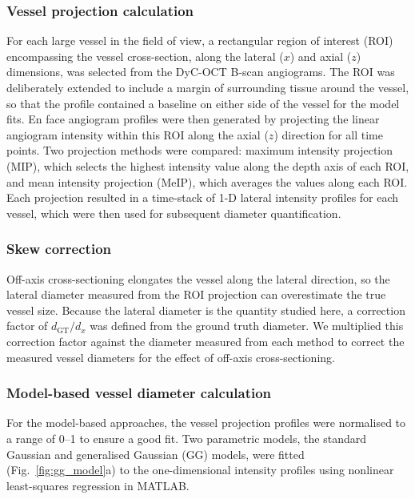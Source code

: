 \subsubsection{Vessel projection calculation}
\label{subsubsec:vessel_projection}
For each large vessel in the field of view, a rectangular region of interest (ROI) encompassing the vessel cross-section, along the lateral ($x$) and axial ($z$) dimensions, was selected from the DyC-OCT B-scan angiograms. The ROI was deliberately extended to include a margin of surrounding tissue around the vessel, so that the profile contained a baseline on either side of the vessel for the model fits. En face angiogram profiles were then generated by projecting the linear angiogram intensity within this ROI along the axial ($z$) direction for all time points. Two projection methods were compared: maximum intensity projection (MIP), which selects the highest intensity value along the depth axis of each ROI, and mean intensity projection (MeIP), which averages the values along each ROI. Each projection resulted in a time-stack of 1-D lateral intensity profiles for each vessel, which were then used for subsequent diameter quantification. 

\subsubsection{Skew correction}
\label{subsubsec:skew_correction}
Off-axis cross-sectioning elongates the vessel along the lateral direction, so the lateral diameter measured from the ROI projection can overestimate the true vessel size. Because the lateral diameter is the quantity studied here, a correction factor of $d_{\mathrm{GT}}/d_x$ was defined from the ground truth diameter. We multiplied this correction factor against the diameter measured from each method to correct the measured vessel diameters for the effect of off-axis cross-sectioning.

\subsubsection{Model-based vessel diameter calculation}
\label{subsubsec:vessel_diameter}
For the model-based approaches, the vessel projection profiles were normalised to a range of 0--1 to ensure a good fit. Two parametric models, the standard Gaussian and generalised Gaussian (GG) models, were fitted (Fig.~\ref{fig:gg_model}a) to the one-dimensional intensity profiles using nonlinear least-squares regression in MATLAB.

